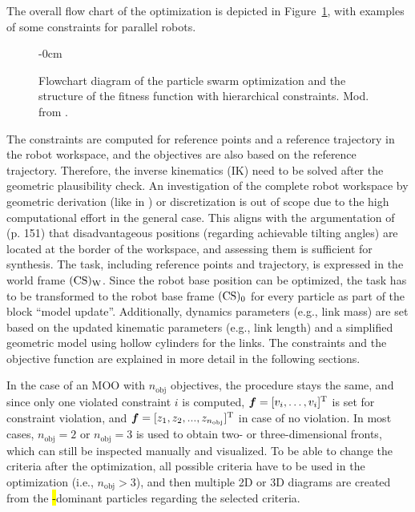 The overall flow chart of the optimization is  depicted in Figure~\ref{fig:optimization_flowchart_basic}, with examples of some constraints for parallel robots.
%
\begin{figure}[H]
\begin{adjustwidth}{-\extralength}{0cm}
  \centering
  \graphicspath{{Figures}}
  
\end{adjustwidth}
\caption[Flowchart of PSO and structure of the fitness function with hierarchical constraints]{Flowchart diagram of the particle swarm optimization and the structure of the fitness function with hierarchical constraints. Mod. from \cite{SchapplerOrt2020}.}
\label{fig:optimization_flowchart_basic}
\end{figure}
%
The constraints are computed for reference points and a reference trajectory in the robot workspace, and the objectives are also based on the reference trajectory.
Therefore, the inverse kinematics (IK) need to be solved after the geometric plausibility check.
An investigation of the complete robot workspace by geometric derivation (like in \cite{Daake2012}) or discretization is out of scope due to the high computational effort in the general case. This aligns with the argumentation of \cite{Kirchner2000} (p. 151) that disadvantageous positions (regarding achievable tilting angles) are located at the border of the workspace, and assessing them is sufficient for synthesis. The task, including reference points and trajectory, is expressed in the world frame $(\mathrm{CS})_{\mathrm{W}}$. Since the robot base position can be optimized, {the task} has to be transformed to the robot base frame $(\mathrm{CS})_{0}$ for every particle %
as part of the block ``model update''. %
Additionally, dynamics parameters (e.g., link mass) are set based on the updated kinematic parameters (e.g., link length) and a simplified geometric model using hollow cylinders for the links. The constraints and the objective function are explained in more detail in the following sections.

In the case of an MOO with $n_\mathrm{obj}$ objectives, the procedure stays the same, and since only one violated constraint $i$ is computed, ${\bm{f}=[v_i,\dots,v_i]^{\mathrm{T}}}$ is set for constraint violation, and ${\bm{f}=[z_1,z_2,...,z_{n_\mathrm{obj}}]^{\mathrm{T}}}$ in case of no violation.
In most cases, $n_\mathrm{obj}=2$ or $n_\mathrm{obj}=3$ is used to obtain two- or three-dimensional  fronts, which can still be inspected manually and visualized.
To be able to change the criteria after the optimization, all possible criteria have to be used in the optimization (i.e., $n_\mathrm{obj}>3$), and then multiple 2D or 3D diagrams are created from the \hl{-}dominant particles regarding the selected criteria. %
%

